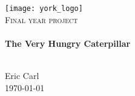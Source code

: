 \begin{titlepage}
\begin{center}
\texttt{[image: york\_logo]}~
\\[4.0cm]
\textsc{\Large Final year project}\\[0.5cm]

\HRule \\[0.4cm]
{ \huge \bfseries The Very Hungry Caterpillar \\[0.4cm] }

\HRule \\[1.5cm]
\large{Eric Carl}\\[3.0cm]
\vfill
{\large\today}
\end{center}
\end{titlepage}
